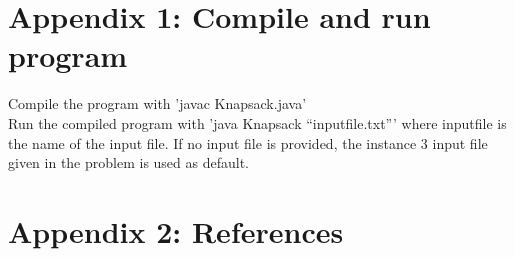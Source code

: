 \documentclass{article}
\begin{document}
\section*{Appendix 1: Compile and run program}
\noindent Compile the program with 'javac Knapsack.java'\\ 
\noindent Run the compiled program with 'java Knapsack ``inputfile.txt''' where inputfile is the name of the input file. If no input file is provided, the instance 3 input file given in the problem is used as default. 

\section*{Appendix 2: References}

\end{document}
